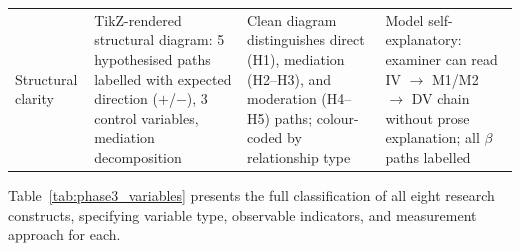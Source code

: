 \begin{xltabular}{\textwidth}{@{} >{\raggedright\arraybackslash}p{0.17\textwidth} X X X @{}}
\addlinespace
Structural clarity     & TikZ-rendered structural diagram: 5 hypothesised paths labelled with expected direction ($+$/$-$), 3 control variables, mediation decomposition & Clean diagram distinguishes direct (H1), mediation (H2--H3), and moderation (H4--H5) paths; colour-coded by relationship type & Model self-explanatory: examiner can read IV $\rightarrow$ M1/M2 $\rightarrow$ DV chain without prose explanation; all $\beta$ paths labelled \\
\end{xltabular}
\endgroup

\vspace{1.5em}

Table~\ref{tab:phase3_variables} presents the full classification of all eight research constructs, specifying variable type, observable indicators, and measurement approach for each.

